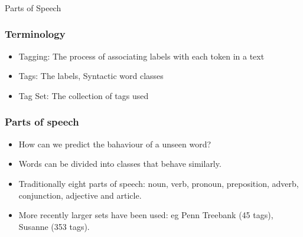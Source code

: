 \begin{frame}[fragile]\frametitle{}

\begin{center}
{\Large Parts of Speech}
\end{center}
\end{frame}

\begin{frame}[fragile]\frametitle{Terminology}

  \begin{itemize}
  \item Tagging: The process of associating labels with each token in a text
  \item Tags: The labels, Syntactic word classes
  \item Tag Set: The collection of tags used
  \end{itemize}
\end{frame}

\begin{frame}[fragile]\frametitle{Parts of speech}

  \begin{itemize}
  \item How can we predict the bahaviour of a unseen word?
  \item Words can be divided into classes that behave similarly.
  \item Traditionally eight parts of speech: noun, verb,
    pronoun, preposition, adverb, conjunction, adjective and article.
  \item More recently larger sets have been used: eg Penn Treebank (45
    tags), Susanne (353 tags).
  \end{itemize}
\end{frame}

